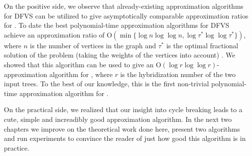 On the positive side, we observe that already-existing approximation algorithms for {\sc DFVS} can be utilized to give asymptotically comparable approximation ratios for \mh. To date the best polynomial-time approximation algorithms for {\sc DFVS} achieve an approximation ratio of $\text{O}( \min\{ \log n \log \log n, \log \tau^{*} \log \log \tau^{*}\} )$, where $n$ is the number of vertices in the graph and $\tau^{*}$ is the optimal fractional solution of the problem (taking the weights of the vertices into account) \cite{dfvsApprox,dfvsSeymour}. We showed that this algorithm can be used to give an $\text{O}( \log r \log \log r )$-approximation algorithm for \mh, where $r$ is the hybridization number of the two input trees. To the best of our knowledge, this is the first non-trivial polynomial-time approximation algorithm for \mh.


On the practical side, we realized that our insight into cycle breaking leads to a cute, simple and increadibly good approximation algorithm. In the next two chapters we improve on the theoretical work done here, present two algorithms and run experiments to convince the reader of just how good this algorithm is in practice. 

% 
